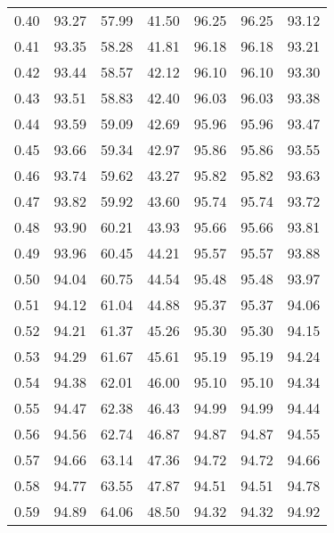 \begin{tabular}{|c|c|c|c|c|c|c|}
      0.40 &     93.27 &     57.99 &      41.50 &   96.25 &      96.25 &         93.12 \\
      0.41 &     93.35 &     58.28 &      41.81 &   96.18 &      96.18 &         93.21 \\
      0.42 &     93.44 &     58.57 &      42.12 &   96.10 &      96.10 &         93.30 \\
      0.43 &     93.51 &     58.83 &      42.40 &   96.03 &      96.03 &         93.38 \\
      0.44 &     93.59 &     59.09 &      42.69 &   95.96 &      95.96 &         93.47 \\
      0.45 &     93.66 &     59.34 &      42.97 &   95.86 &      95.86 &         93.55 \\
      0.46 &     93.74 &     59.62 &      43.27 &   95.82 &      95.82 &         93.63 \\
      0.47 &     93.82 &     59.92 &      43.60 &   95.74 &      95.74 &         93.72 \\
      0.48 &     93.90 &     60.21 &      43.93 &   95.66 &      95.66 &         93.81 \\
      0.49 &     93.96 &     60.45 &      44.21 &   95.57 &      95.57 &         93.88 \\
      0.50 &     94.04 &     60.75 &      44.54 &   95.48 &      95.48 &         93.97 \\
      0.51 &     94.12 &     61.04 &      44.88 &   95.37 &      95.37 &         94.06 \\
      0.52 &     94.21 &     61.37 &      45.26 &   95.30 &      95.30 &         94.15 \\
      0.53 &     94.29 &     61.67 &      45.61 &   95.19 &      95.19 &         94.24 \\
      0.54 &     94.38 &     62.01 &      46.00 &   95.10 &      95.10 &         94.34 \\
      0.55 &     94.47 &     62.38 &      46.43 &   94.99 &      94.99 &         94.44 \\
      0.56 &     94.56 &     62.74 &      46.87 &   94.87 &      94.87 &         94.55 \\
      0.57 &     94.66 &     63.14 &      47.36 &   94.72 &      94.72 &         94.66 \\
      0.58 &     94.77 &     63.55 &      47.87 &   94.51 &      94.51 &         94.78 \\
      0.59 &     94.89 &     64.06 &      48.50 &   94.32 &      94.32 &         94.92 \\

\end{tabular}
